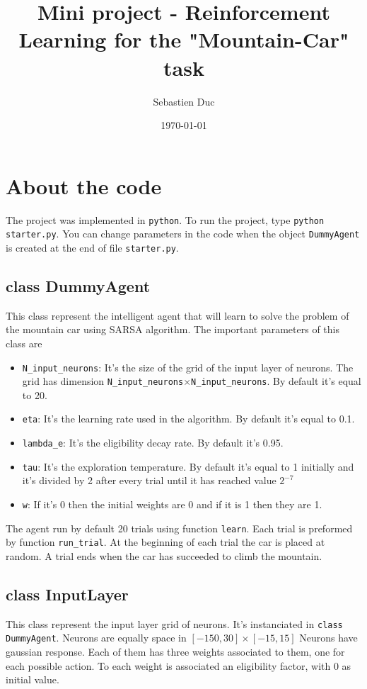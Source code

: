 \documentclass[12pt,a4paper]{article}
\author{Sebastien Duc}
\date{\today}
\title{Mini project - Reinforcement Learning for the "Mountain-Car" task}
\begin{document}
\maketitle
{}

\section*{About the code}

The project was implemented in \texttt{python}. To run the project, type 
\texttt{python starter.py}. You can change parameters in the code when the object \texttt{DummyAgent} is created at the end of file \texttt{starter.py}.

\subsection*{class DummyAgent}
This class represent the intelligent agent that will learn to solve the problem of the mountain car using SARSA algorithm.
The important parameters of this class are
\begin{itemize}
    \item \texttt{N\_input\_neurons}: It's the size of the grid of the input layer of neurons.
    The grid has dimension \texttt{N\_input\_neurons}$\times$\texttt{N\_input\_neurons}. By default it's equal to 20.
    \item \texttt{eta}: It's the learning rate used in the algorithm. By default it's equal to 0.1.
    \item \texttt{lambda\_e}: It's the eligibility decay rate. By default it's 0.95.
    \item \texttt{tau}: It's the exploration temperature. By default it's equal to 1 initially and it's divided by 2 after every trial until it has reached value $2^{-7}$
    \item \texttt{w}: If it's  0 then the initial weights are 0 and if it is 1 then they are 1.
\end{itemize}
The agent run by default 20 trials using function \texttt{learn}. Each trial is preformed by function \texttt{run\_trial}. At the beginning of each trial the car is placed at random.
A trial ends when the car has succeeded to climb the mountain.

\subsection*{class InputLayer}
This class represent the input layer grid of neurons. It's instanciated in \texttt{class DummyAgent}. Neurons are equally space in $[-150,30]\times[-15,15]$
Neurons have gaussian response. Each of them has three weights associated to them, one for each possible action. To each weight is associated an eligibility factor, with 0 as initial 
value.
\end{document}
